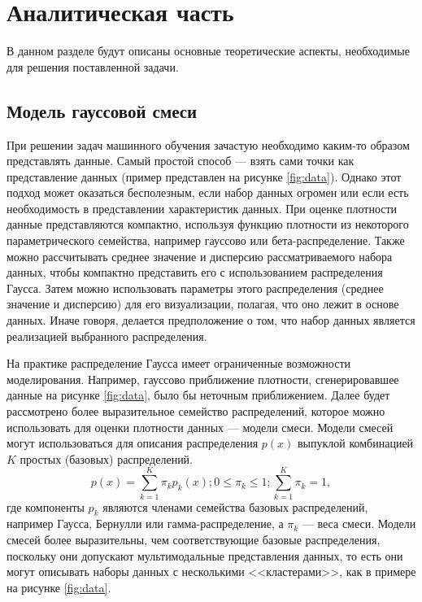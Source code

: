 \chapter{Аналитическая часть}

В данном разделе будут описаны основные теоретические аспекты, необходимые для решения поставленной задачи.

\section{Модель гауссовой смеси}

При решении задач машинного обучения зачастую необходимо каким-то образом представлять данные. Самый простой способ --- взять сами точки как представление данных (пример представлен на рисунке \ref{fig:data}). Однако этот подход может оказаться бесполезным, если набор данных огромен или если есть необходимость в представлении характеристик данных. При оценке плотности данные представляются компактно, используя функцию плотности из некоторого параметрического семейства, например гауссово или бета-распределение. Также можно рассчитывать среднее значение и дисперсию рассматриваемого набора данных, чтобы компактно представить его с использованием распределения Гаусса. Затем можно использовать параметры этого распределения (среднее значение и дисперсию) для его визуализации, полагая, что оно лежит в основе данных. Иначе говоря, делается предположение о том, что набор данных является реализацией выбранного распределения.~\cite{math}

На практике распределение Гаусса имеет ограниченные возможности моделирования. Например, гауссово приближение плотности, сгенерировавшее данные на рисунке \ref{fig:data}, было бы неточным приближением. Далее будет рассмотрено более выразительное семейство распределений, которое можно использовать для оценки плотности данных --- модели смеси. Модели смесей могут использоваться для описания распределения $p(x)$ выпуклой комбинацией $K$ простых (базовых) распределений.~\cite{math}
\begin{equation}
	p(x) = \sum_{k=1}^{K}\pi_k p_k(x); 0 \leq \pi_k \leq 1; \sum_{k=1}^{K}\pi_k = 1,
\end{equation}
где компоненты $p_k$ являются членами семейства базовых распределений, например Гаусса, Бернулли или гамма-распределение, а $\pi_k$ --- веса смеси. Модели смесей более выразительны, чем соответствующие базовые распределения, поскольку они допускают мультимодальные представления данных, то есть они могут описывать наборы данных с несколькими <<кластерами>>, как в примере на рисунке \ref{fig:data}.~\cite{math}


